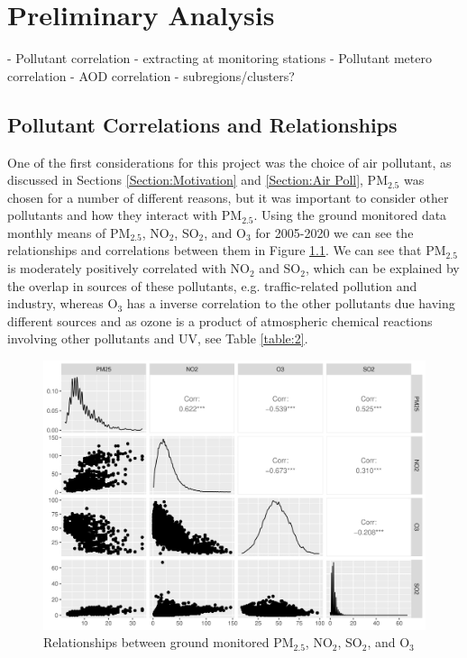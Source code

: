 \chapter{Preliminary Analysis} \label{App:preanalysis}
 - Pollutant correlation
 - extracting at monitoring stations
 - Pollutant metero correlation
 - AOD correlation
 - subregions/clusters?

\section{Pollutant Correlations and Relationships} \label{App:Corrs}
 
One of the first considerations for this project was the choice of air pollutant, as discussed in Sections \ref{Section:Motivation} and \ref{Section:Air Poll}, PM$_{2.5}$ was chosen for a number of different reasons, but it was important to consider other pollutants and how they interact with PM$_{2.5}$. Using the ground monitored data monthly means of PM$_{2.5}$, NO$_{2}$, SO$_{2}$, and O$_{3}$ for 2005-2020 we can see the relationships and correlations between them in Figure \ref{fig:pollcorr}. We can see that PM$_{2.5}$ is moderately positively correlated with NO$_{2}$ and SO$_{2}$, which can be explained by the overlap in sources of these pollutants, e.g. traffic-related pollution and industry, whereas O$_{3}$ has a inverse correlation to the other pollutants due having different sources and as ozone is a product of atmospheric chemical reactions involving other pollutants and UV, see Table \ref{table:2}.

\begin{figure}[h]
    \centering
    \includegraphics[width=1\textwidth]{Images/PollCorr-1.jpg}
    \caption{Relationships between ground monitored PM$_{2.5}$, NO$_{2}$, SO$_{2}$, and O$_{3}$}
    \label{fig:pollcorr}
\end{figure}

